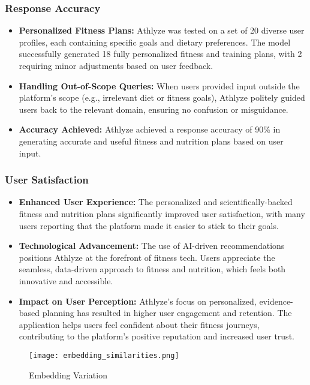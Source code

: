 \documentclass[conference]{IEEEtran}
\begin{document}
\subsubsection{Response Accuracy}

\begin{itemize}
    \item \textbf{Personalized Fitness Plans:} Athlyze was tested on a set of 20 diverse user profiles, each containing specific goals and dietary preferences. The model successfully generated 18 fully personalized fitness and training plans, with 2 requiring minor adjustments based on user feedback.
    \item \textbf{Handling Out-of-Scope Queries:} When users provided input outside the platform's scope (e.g., irrelevant diet or fitness goals), Athlyze politely guided users back to the relevant domain, ensuring no confusion or misguidance.
    \item \textbf{Accuracy Achieved:} Athlyze achieved a response accuracy of 90\% in generating accurate and useful fitness and nutrition plans based on user input.
\end{itemize}

\subsubsection{User Satisfaction}

\begin{itemize}
    \item \textbf{Enhanced User Experience:} The personalized and scientifically-backed fitness and nutrition plans significantly improved user satisfaction, with many users reporting that the platform made it easier to stick to their goals.
    \item \textbf{Technological Advancement:} The use of AI-driven recommendations positions Athlyze at the forefront of fitness tech. Users appreciate the seamless, data-driven approach to fitness and nutrition, which feels both innovative and accessible.
    \item \textbf{Impact on User Perception:} Athlyze's focus on personalized, evidence-based planning has resulted in higher user engagement and retention. The application helps users feel confident about their fitness journeys, contributing to the platform's positive reputation and increased user trust.
\end{itemize}

\begin{figure}[h!]
    \centering
    \texttt{[image: embedding\_similarities.png]}
    \caption{Embedding Variation}
    \label{fig:RAG}
\end{figure}
\end{document}
